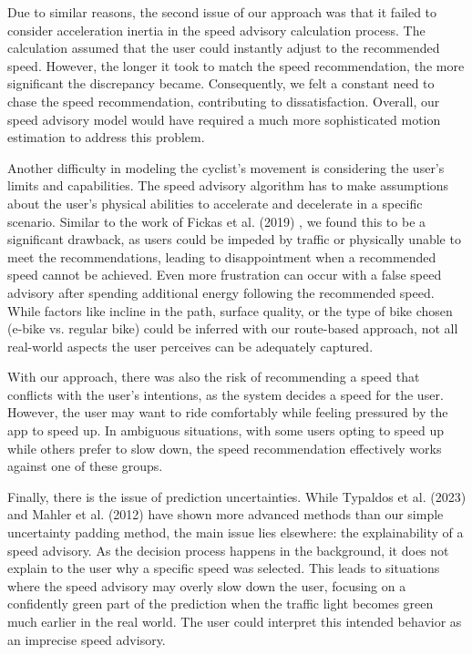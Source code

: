 Due to similar reasons, the second issue of our approach was that it failed to consider acceleration inertia in the speed advisory calculation process. The calculation assumed that the user could instantly adjust to the recommended speed. However, the longer it took to match the speed recommendation, the more significant the discrepancy became. Consequently, we felt a constant need to chase the speed recommendation, contributing to dissatisfaction. Overall, our speed advisory model would have required a much more sophisticated motion estimation to address this problem.

Another difficulty in modeling the cyclist's movement is considering the user's limits and capabilities. The speed advisory algorithm has to make assumptions about the user's physical abilities to accelerate and decelerate in a specific scenario. Similar to the work of Fickas et al. (2019) \cite{fickas_fast_2019}, we found this to be a significant drawback, as users could be impeded by traffic or physically unable to meet the recommendations, leading to disappointment when a recommended speed cannot be achieved. Even more frustration can occur with a false speed advisory after spending additional energy following the recommended speed. While factors like incline in the path, surface quality, or the type of bike chosen (e-bike vs. regular bike) could be inferred with our route-based approach, not all real-world aspects the user perceives can be adequately captured.

With our approach, there was also the risk of recommending a speed that conflicts with the user's intentions, as the system decides a speed for the user. However, the user may want to ride comfortably while feeling pressured by the app to speed up. In ambiguous situations, with some users opting to speed up while others prefer to slow down, the speed recommendation effectively works against one of these groups. 

Finally, there is the issue of prediction uncertainties. While Typaldos et al. (2023) \cite{typaldos_modified_2023} and Mahler et al. (2012) \cite{mahler_reducing_2012} have shown more advanced methods than our simple uncertainty padding method, the main issue lies elsewhere: the explainability of a speed advisory. As the decision process happens in the background, it does not explain to the user why a specific speed was selected. This leads to situations where the speed advisory may overly slow down the user, focusing on a confidently green part of the prediction when the traffic light becomes green much earlier in the real world. The user could interpret this intended behavior as an imprecise speed advisory.

